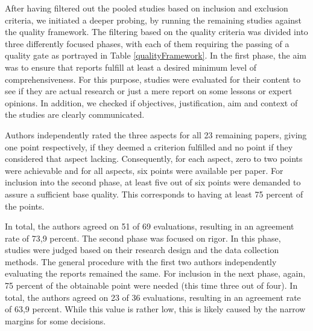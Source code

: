 \documentclass{bmcart}
\begin{document}
After having filtered out the pooled studies based on inclusion and exclusion criteria, we initiated a deeper probing, by running the remaining studies against the quality framework. The filtering based on the quality criteria was divided into three differently focused phases, with each of them requiring the passing of a quality gate as portrayed in Table \ref{qualityFramework}. In the first phase, the aim was to ensure that reports fulfill at least a desired minimum level of comprehensiveness. For this purpose, studies were evaluated for their content to see if they are actual research or just a mere report on some lessons or expert opinions. In addition, we checked if objectives, justification, aim and context of the studies are clearly communicated.



Authors independently rated the three aspects for all 23 remaining papers, giving one point respectively, if they deemed a criterion fulfilled and no point if they considered that aspect lacking. Consequently, for each aspect, zero to two points were achievable and for all aspects, six points were available per paper. For inclusion into the second phase, at least five out of six points were demanded to assure a sufficient base quality. This corresponds to having at least 75 percent of the points. 



In total, the authors agreed on 51 of 69 evaluations, resulting in an agreement rate of 73,9 percent. The second phase was focused on rigor. In this phase, studies were judged based on their research design and the data collection methods. The general procedure with the first two authors independently evaluating the reports remained the same. For inclusion in the next phase, again, 75 percent of the obtainable point were needed (this time three out of four). In total, the authors agreed on 23 of 36 evaluations, resulting in an agreement rate of 63,9 percent. While this value is rather low, this is likely caused by the narrow margins for some decisions. 
\end{document}
